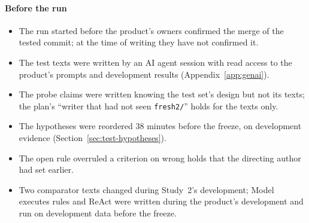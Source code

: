 \paragraph{Before the run}
\begin{itemize}[leftmargin=1.2em,itemsep=1pt]
\item The run started before the product's owners confirmed the merge of the tested commit; at the time of writing they have not confirmed it.
\item The test texts were written by an AI agent session with read access to the product's prompts and development results (Appendix~\ref{app:genai}).
\item The probe claims were written knowing the test set's design but not its texts; the plan's ``writer that had not seen \texttt{fresh2/}'' holds for the texts only.
\item The hypotheses were reordered 38 minutes before the freeze, on development evidence (Section~\ref{sec:test-hypotheses}).
\item The open rule overruled a criterion on wrong holds that the directing author had set earlier.
\item Two comparator texts changed during Study~2's development; Model executes rules and ReAct were written during the product's development and run on development data before the freeze.
\end{itemize}

